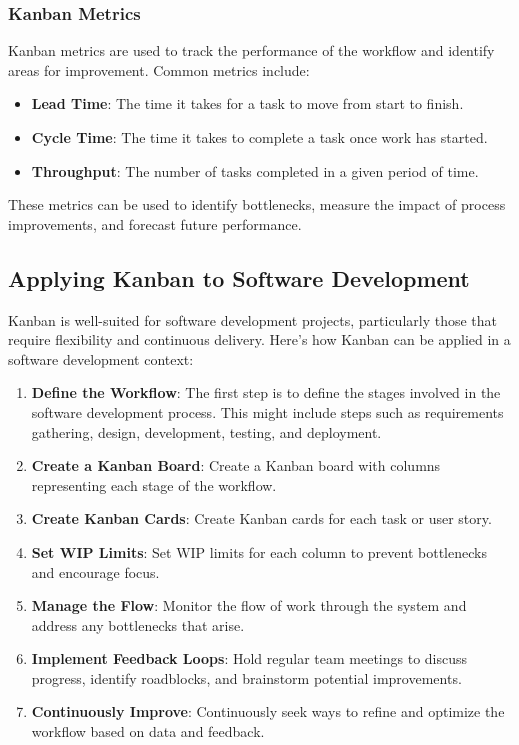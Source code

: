 \subsubsection{Kanban Metrics}

Kanban metrics are used to track the performance of the workflow and identify
areas for improvement. Common metrics include:

\begin{itemize}
  \item \textbf{Lead Time}: The time it takes for a task to move from start to finish.
  \item \textbf{Cycle Time}: The time it takes to complete a task once work has started.
  \item \textbf{Throughput}: The number of tasks completed in a given period of time.
\end{itemize}

These metrics can be used to identify bottlenecks, measure the impact of
process improvements, and forecast future performance.

\subsection{Applying Kanban to Software Development}

Kanban is well-suited for software development projects, particularly those
that require flexibility and continuous delivery. Here's how Kanban can be
applied in a software development context:

\begin{enumerate}
  \item \textbf{Define the Workflow}: The first step is to define the stages involved in the software development process. This might include steps such as requirements gathering, design, development, testing, and deployment.
  \item \textbf{Create a Kanban Board}: Create a Kanban board with columns representing each stage of the workflow.
  \item \textbf{Create Kanban Cards}: Create Kanban cards for each task or user story.
  \item \textbf{Set WIP Limits}: Set WIP limits for each column to prevent bottlenecks and encourage focus.
  \item \textbf{Manage the Flow}: Monitor the flow of work through the system and address any bottlenecks that arise.
  \item \textbf{Implement Feedback Loops}: Hold regular team meetings to discuss progress, identify roadblocks, and brainstorm potential improvements.
  \item \textbf{Continuously Improve}: Continuously seek ways to refine and optimize the workflow based on data and feedback.
\end{enumerate}

